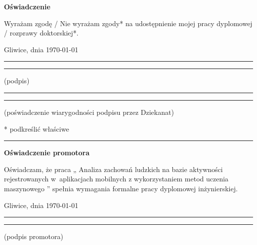 \documentclass[a4paper,twoside,12pt]{book}
\newcommand{\tytul}{
Analiza zachowań ludzkich na bazie aktywności rejestrowanych 
w~aplikacjach mobilnych z wykorzystaniem metod uczenia maszynowego
}
\begin{document}
\vfill  

\begin{center}
\Large\bfseries Oświadczenie
\end{center}

\vfill

Wyrażam  zgodę / Nie wyrażam zgody*  na  udostępnienie  mojej  pracy  dyplomowej / rozprawy doktorskiej*.

\vfill

Gliwice, dnia \today

\vfill

\rule{0.5\textwidth}{0cm}\dotfill 

\rule{0.5\textwidth}{0cm}
\begin{minipage}{0.45\textwidth}
{\begin{center}(podpis)\end{center}}
\end{minipage} 

\vfill

\rule{0.5\textwidth}{0cm}\dotfill 

\rule{0.5\textwidth}{0cm}
\begin{minipage}{0.45\textwidth}
{\begin{center}\rule{0mm}{5mm}(poświadczenie wiarygodności podpisu przez Dziekanat)\end{center}}
\end{minipage}


\vfill

* podkreślić właściwe

 


\cleardoublepage

\rule{1cm}{0cm}

\vfill  

\begin{center}
\Large\bfseries Oświadczenie promotora
\end{center}

\vfill

Oświadczam, że praca „\tytul” spełnia wymagania formalne pracy dyplomowej inżynierskiej.

\vfill



\vfill

Gliwice, dnia \today

\rule{0.5\textwidth}{0cm}\dotfill 

\rule{0.5\textwidth}{0cm}
\begin{minipage}{0.45\textwidth}
{\begin{center}(podpis promotora)\end{center}}
\end{minipage} 
\end{document}
